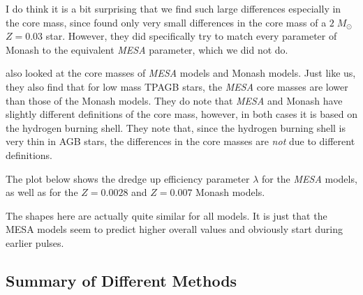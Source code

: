 \documentclass[a4paper,10pt]{article}
\begin{document}
\begin{figure}[ht]
    \centering
\end{figure}

I do think it is a bit surprising that we find such large differences especially in the core mass, since \citet{cinquegrana2022} found only very small differences in the core mass of a \(2\;M_\odot\) \(Z=0.03\) star. However, they did specifically try to match every parameter of Monash to the equivalent \emph{MESA} parameter, which we did not do.

\citet{rees2024b} also looked at the core masses of \emph{MESA} models and Monash models. Just like us, they also find that for low mass TPAGB stars, the \emph{MESA} core masses are lower than those of the Monash models. They do note that \emph{MESA} and Monash have slightly different definitions of the core mass, however, in both cases it is based on the hydrogen burning shell. They note that, since the hydrogen burning shell is very thin in AGB stars, the differences in the core masses are \emph{not} due to different definitions.

The plot below shows the dredge up efficiency parameter \(\lambda\) for the \emph{MESA} models, as well as for the \(Z=0.0028\) and \(Z=0.007\) Monash models.
\begin{figure}[ht]
    \centering
\end{figure}

The shapes here are actually quite similar for all models. It is just that the MESA models seem to predict higher overall values and obviously start during earlier pulses.


\subsection{Summary of Different Methods}
\end{document}
